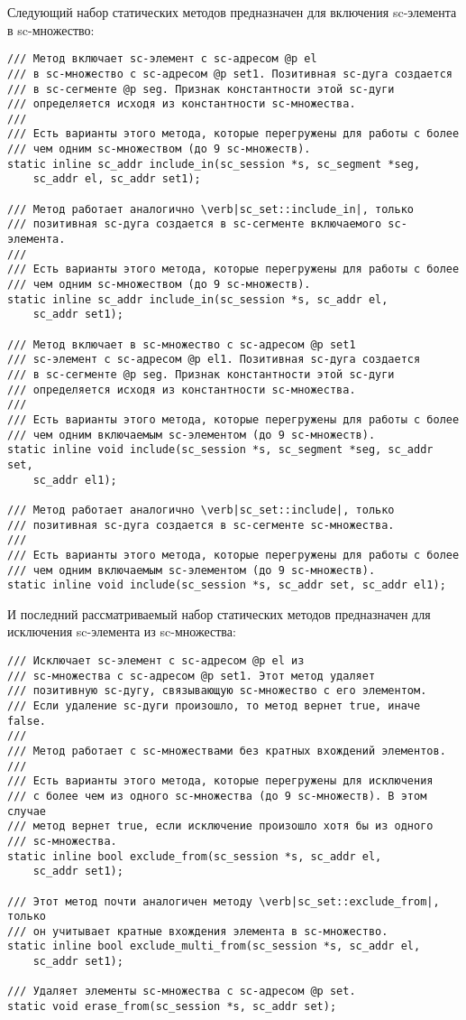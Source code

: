 Следующий набор статических методов предназначен для включения
sc-элемента в sc-множество:
\begin{lstlisting}[texcl]
/// Метод включает sc-элемент с sc-адресом @p el
/// в sc-множество с sc-адресом @p set1. Позитивная sc-дуга создается
/// в sc-сегменте @p seg. Признак константности этой sc-дуги
/// определяется исходя из константности sc-множества.
///
/// Есть варианты этого метода, которые перегружены для работы с более
/// чем одним sc-множеством (до 9 sc-множеств).
static inline sc_addr include_in(sc_session *s, sc_segment *seg,
    sc_addr el, sc_addr set1);

/// Метод работает аналогично \verb|sc_set::include_in|, только
/// позитивная sc-дуга создается в sc-сегменте включаемого sc-элемента.
///
/// Есть варианты этого метода, которые перегружены для работы с более
/// чем одним sc-множеством (до 9 sc-множеств).
static inline sc_addr include_in(sc_session *s, sc_addr el,
    sc_addr set1);

/// Метод включает в sc-множество с sc-адресом @p set1
/// sc-элемент с sc-адресом @p el1. Позитивная sc-дуга создается
/// в sc-сегменте @p seg. Признак константности этой sc-дуги
/// определяется исходя из константности sc-множества.
///
/// Есть варианты этого метода, которые перегружены для работы с более
/// чем одним включаемым sc-элементом (до 9 sc-множеств).
static inline void include(sc_session *s, sc_segment *seg, sc_addr set,
    sc_addr el1);

/// Метод работает аналогично \verb|sc_set::include|, только
/// позитивная sc-дуга создается в sc-сегменте sc-множества.
///
/// Есть варианты этого метода, которые перегружены для работы с более
/// чем одним включаемым sc-элементом (до 9 sc-множеств).
static inline void include(sc_session *s, sc_addr set, sc_addr el1);
\end{lstlisting}

И последний рассматриваемый набор статических методов предназначен для
исключения sc-элемента из sc-множества:
\begin{lstlisting}[texcl]
/// Исключает sc-элемент с sc-адресом @p el из
/// sc-множества с sc-адресом @p set1. Этот метод удаляет
/// позитивную sc-дугу, связывающую sc-множество с его элементом.
/// Если удаление sc-дуги произошло, то метод вернет true, иначе false.
///
/// Метод работает с sc-множествами без кратных вхождений элементов.
///
/// Есть варианты этого метода, которые перегружены для исключения
/// с более чем из одного sc-множества (до 9 sc-множеств). В этом случае
/// метод вернет true, если исключение произошло хотя бы из одного
/// sc-множества.
static inline bool exclude_from(sc_session *s, sc_addr el,
    sc_addr set1);

/// Этот метод почти аналогичен методу \verb|sc_set::exclude_from|, только
/// он учитывает кратные вхождения элемента в sc-множество.
static inline bool exclude_multi_from(sc_session *s, sc_addr el,
    sc_addr set1);

/// Удаляет элементы sc-множества с sc-адресом @p set.
static void erase_from(sc_session *s, sc_addr set);
\end{lstlisting}

